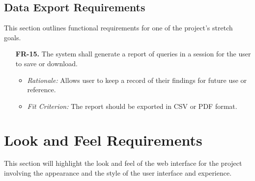 \documentclass[12pt]{article}
\begin{document}
\subsection{Data Export Requirements}
This section outlines functional requirements for one of the project's stretch goals.
\begin{enumerate}
  \item[\textbf{FR-15.}] The system shall generate a report of queries in a session for the user to save or download.
  \begin{itemize}
    \item \textit{Rationale:} Allows user to keep a record of their findings for future use or reference.
    \item \textit{Fit Criterion:} The report should be exported in CSV or PDF format.
  \end{itemize}
\end{enumerate}

\section{Look and Feel Requirements}
This section will highlight the look and feel of the web interface for the
project involving the appearance and the style of the user interface and
experience.
\end{document}
